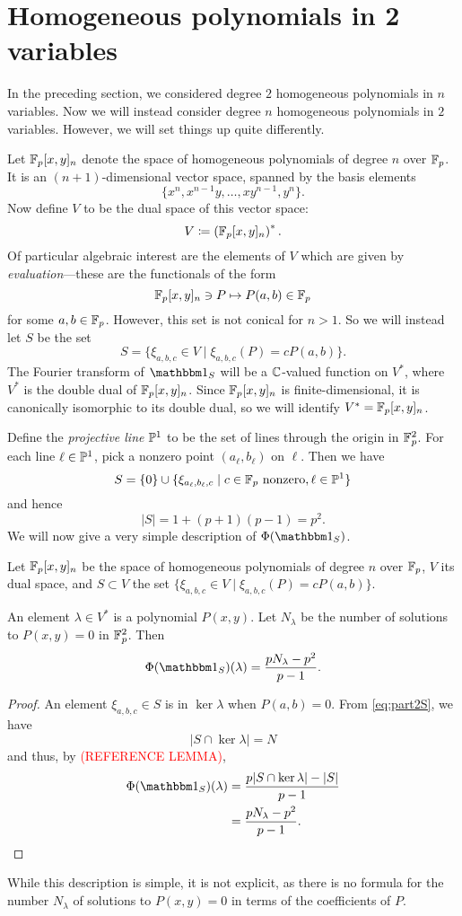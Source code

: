 \section{Homogeneous polynomials in 2 variables}\label{sec:part2}
In the preceding section, we considered degree $2$ homogeneous polynomials in $n$ variables. Now we will instead consider degree $n$ homogeneous polynomials in $2$ variables. However, we will set things up quite differently.

Let $\F_p[x,y]_n$ denote the space of homogeneous polynomials of degree $n$ over $\F_p$. It is an $(n+1)$-dimensional vector space, spanned by the basis elements
\[
	\{x^n, x^{n-1}y, \ldots, xy^{n-1}, y^n\}.
\]
Now define $V$ to be the dual space of this vector space:
\[
	V \coloneqq \left(\F_p[x,y]_n\right)^*.
\]
Of particular algebraic interest are the elements of $V$ which are given by \emph{evaluation}---these are the functionals of the form
\[
	\F_p[x,y]_n \ni P \mapsto P(a,b) \in \F_p
\]
for some $a,b\in \F_p$. However, this set is not conical for $n>1$. So we will instead let $S$ be the set
\[
	S=\{\xi_{a,b,c} \in V \mid \xi_{a,b,c}(P) = cP(a,b)\}.
\]
The Fourier transform of $\IND_S$ will be a $\C$-valued function on $V^*$, where $V^*$ is the double dual of $\F_p[x,y]_n$. Since $\F_p[x,y]_n$ is finite-dimensional, it is canonically isomorphic to its double dual, so we will identify $V^* = \F_p[x,y]_n$.

Define the \emph{projective line} $\P^1$ to be the set of lines through the origin in $\F_p^2$. For each line $\ell \in \P^1$, pick a nonzero point $(a_\ell,b_\ell)$ on $\ell$. Then we have
\begin{equation}\label{eq:part2S}
	S = \{0\} \cup \{\xi_{a_\ell,b_\ell,c} \mid c\in \F_p \text{ nonzero}, \ell \in \P^1 \}
\end{equation}
and hence
\[
	|S| = 1 + (p+1)(p-1) = p^2.
\]
We will now give a very simple description of $\Phi(\IND_S)$.
\begin{thm}\label{thm:part2thm}
	Let $\F_p[x,y]_n$ be the space of homogeneous polynomials of degree $n$ over $\F_p$, $V$ its dual space, and $S\subset V$ the set $\{\xi_{a,b,c} \in V \mid \xi_{a,b,c}(P) = cP(a,b)\}$.
	
	An element $\lambda \in V^*$ is a polynomial $P(x,y)$. Let $N_\lambda$ be the number of solutions to $P(x,y)=0$ in $\F_p^2$. Then
	\[
		\Phi(\IND_S)(\lambda) = \frac{pN_\lambda - p^2}{p-1}.
	\]
\end{thm}
\begin{proof}
	An element $\xi_{a,b,c}\in S$ is in $\ker \lambda$ when $P(a,b) = 0$. From \eqref{eq:part2S}, we have
	\[
		|S \cap \ker \lambda| = N
	\]
	and thus, by \textcolor{red}{(REFERENCE LEMMA)},
	\begin{align*}
		\Phi (\IND_S) (\lambda) &= \frac{p|S\cap \ker \lambda| - |S|}{p-1}\\
		&= \frac{pN_\lambda - p^2}{p-1}.\qedhere
	\end{align*}
\end{proof}
While this description is simple, it is not explicit, as there is no formula for the number $N_\lambda$ of solutions to $P(x,y) = 0$ in terms of the coefficients of $P$.

